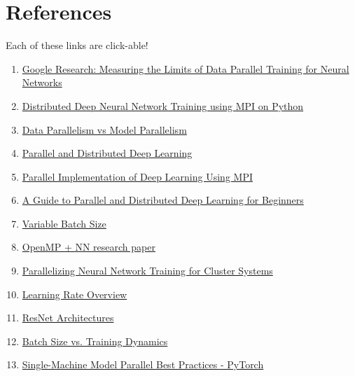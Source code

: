 \documentclass{article}
\begin{document}
\newpage


\section{References}

Each of these links are click-able!

\begin{enumerate}
  \item \href{https://ai.googleblog.com/2019/03/measuring-limits-of-data-parallel.html}{Google Research: Measuring the Limits of Data Parallel Training for Neural Networks}
  \item \href{https://www.pyohio.org/2019/presentations/123}{Distributed Deep Neural Network Training using MPI on Python}
  \item \href{https://leimao.github.io/blog/Data-Parallelism-vs-Model-Paralelism/}{Data Parallelism vs Model Parallelism}
  \item \href{https://web.stanford.edu/~rezab/classes/cme323/S16/projects_reports/hedge_usmani.pdf}{Parallel and Distributed Deep Learning}
  \item \href{https://cse.buffalo.edu/faculty/miller/Courses/CSE633/Ma-Spring-2014-CSE633.pdf}{Parallel Implementation of Deep Learning Using MPI}
  \item \href{https://analyticsindiamag.com/a-guide-to-parallel-and-distributed-deep-learning-for-beginners/}{A Guide to Parallel and Distributed Deep Learning for Beginners}
  \item \href{https://arxiv.org/pdf/1404.5997.pdf}{Variable Batch Size}
  \item \href{https://citeseerx.ist.psu.edu/viewdoc/download?doi=10.1.1.595.8618&rep=rep1&type=pdf}{OpenMP + NN research paper}
  \item \href{https://www.cs.swarthmore.edu/~newhall/papers/pdcn08.pdf}{Parallelizing Neural Network Training for Cluster Systems}
  \item \href{https://www.jeremyjordan.me/nn-learning-rate/}{Learning Rate Overview}
  \item \href{https://towardsdatascience.com/an-overview-of-resnet-and-its-variants-5281e2f56035}{ResNet Architectures}
  \item \href{https://medium.com/mini-distill/effect-of-batch-size-on-training-dynamics-21c14f7a716e}{Batch Size vs. Training Dynamics}
  \item \href{https://pytorch.org/tutorials/intermediate/model_parallel_tutorial.html}{Single-Machine Model Parallel Best Practices - PyTorch}

\end{enumerate}
\end{document}
